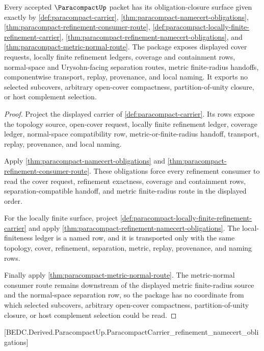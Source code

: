 \begin{theorem}
\label{thm:paracompact-obligation-closure-package}
Every accepted $\ParacompactUp$ packet has its obligation-closure surface given exactly by \autoref{def:paracompact-carrier}, \autoref{thm:paracompact-namecert-obligations}, \autoref{thm:paracompact-refinement-consumer-route}, \autoref{def:paracompact-locally-finite-refinement-carrier}, \autoref{thm:paracompact-refinement-namecert-obligations}, and \autoref{thm:paracompact-metric-normal-route}. The package exposes displayed cover requests, locally finite refinement ledgers, coverage and containment rows, normal-space and Urysohn-facing separation routes, metric finite-radius handoffs, componentwise transport, replay, provenance, and local naming. It exports no selected subcovers, arbitrary open-cover compactness, partition-of-unity closure, or host complement selection.
\end{theorem}
\begin{proof}
Project the displayed carrier of \autoref{def:paracompact-carrier}. Its rows expose the topology source, open-cover request, locally finite refinement ledger, coverage ledger, normal-space compatibility row, metric-or-finite-radius handoff, transport, replay, provenance, and local naming.

Apply \autoref{thm:paracompact-namecert-obligations} and \autoref{thm:paracompact-refinement-consumer-route}. These obligations force every refinement consumer to read the cover request, refinement exactness, coverage and containment rows, separation-compatible handoff, and metric finite-radius route in the displayed order.

For the locally finite surface, project \autoref{def:paracompact-locally-finite-refinement-carrier} and apply \autoref{thm:paracompact-refinement-namecert-obligations}. The local-finiteness ledger is a named row, and it is transported only with the same topology, cover, refinement, separation, metric, replay, provenance, and naming rows.

Finally apply \autoref{thm:paracompact-metric-normal-route}. The metric-normal consumer route remains downstream of the displayed metric finite-radius source and the normal-space separation row, so the package has no coordinate from which selected subcovers, arbitrary open-cover compactness, partition-of-unity closure, or host complement selection could be read.
\end{proof}
[BEDC.Derived.ParacompactUp.ParacompactCarrier\_refinement\_namecert\_obligations]

